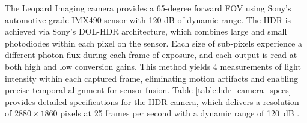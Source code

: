\documentclass[../main.tex]{subfiles}
\begin{document}
The Leopard Imaging camera provides a 65-degree forward \ac{FOV} using Sony’s automotive-grade IMX490 sensor with 120 dB of dynamic range.
The \ac{HDR} is achieved via Sony’s \ac{DOL-HDR} architecture, which combines large and small photodiodes within each pixel on the sensor.
Each size of sub-pixels experience a different photon flux during each frame of exposure, and each output is read at both high and low conversion gains.
This method yields 4 measurements of light intensity within each captured frame, eliminating motion artifacts and enabling precise temporal alignment for sensor fusion.
Table \ref{table:hdr_camera_specs} provides detailed specifications for the HDR camera, which delivers a resolution of $2880 \times 1860$ pixels at 25 frames per second with a dynamic range of 120~dB
.%


\end{document}
